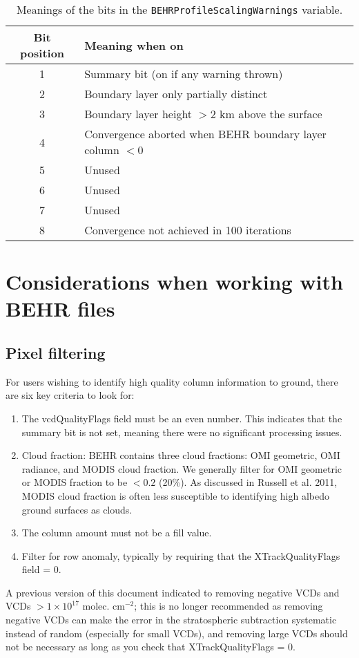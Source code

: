 \documentclass[12pt]{article}
\begin{document}
	\begin{table}
	\begin{tabular}{cl}
	Bit position & Meaning when on \\ \hline
	1		&	Summary bit (on if any warning thrown) \\
	2		&	Boundary layer only partially distinct \\
	3		&	Boundary layer height $>2$ km above the surface \\
	4		&	Convergence aborted when BEHR boundary layer column $< 0$ \\
	5		&	Unused \\
	6		&	Unused \\
	7		&	Unused \\
	8		&	Convergence not achieved in 100 iterations
	\end{tabular}
	\caption{Meanings of the bits in the \texttt{BEHRProfileScalingWarnings} variable.}
	\end{table}

\section{Considerations when working with BEHR files}
	\subsection{Pixel filtering}
	For users wishing to identify high quality  column information to ground, there are six key criteria to look for:
	\begin{enumerate}
        \item The vcdQualityFlags field must be an even number. This indicates that
the summary bit is not set, meaning there were no significant processing issues.
        \item Cloud fraction: BEHR contains three cloud fractions: OMI geometric,
OMI radiance, and MODIS cloud fraction. We generally filter for OMI geometric or MODIS fraction to be $< 0.2$ (20\%).  As discussed in Russell et al. 2011, MODIS cloud fraction is often less susceptible to identifying high albedo ground surfaces as clouds.
        \item The column amount must not be a fill value.
        \item Filter for row anomaly, typically by requiring that the 
XTrackQualityFlags field = 0.
	\end{enumerate}
	
	A previous version of this document indicated to removing negative VCDs and VCDs $> 1 \times 10^{17}$ molec. cm$^{-2}$; this is no longer recommended as removing negative VCDs can make the error in the stratospheric subtraction systematic instead of random (especially for small VCDs), and removing large VCDs should not be necessary as long as you check that XTrackQualityFlags = 0.
	
\end{document}
